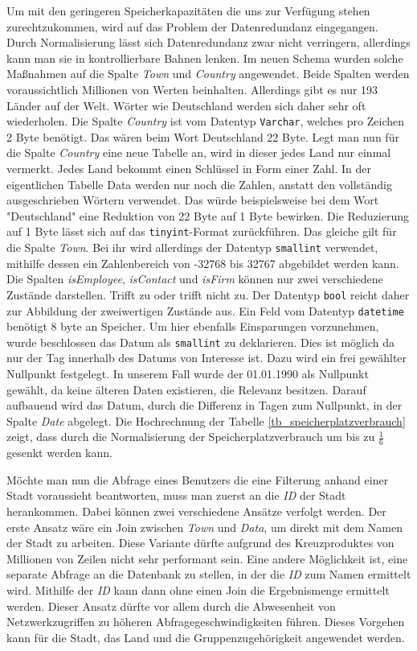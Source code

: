 Um mit den geringeren Speicherkapazitäten die uns zur Verfügung stehen zurechtzukommen, wird auf das Problem der Datenredundanz eingegangen. Durch Normalisierung lässt sich Datenredundanz zwar nicht verringern, allerdings kann man sie in kontrollierbare Bahnen lenken. Im neuen Schema wurden solche Maßnahmen auf die Spalte \textit{Town} und \textit{Country} angewendet. Beide Spalten werden voraussichtlich Millionen von Werten beinhalten. Allerdings gibt es nur 193 Länder auf der Welt. Wörter wie Deutschland werden sich daher sehr oft wiederholen. Die Spalte \textit{Country} ist vom Datentyp \texttt{Varchar}, welches pro Zeichen 2 Byte benötigt. Das wären beim Wort Deutschland 22 Byte. Legt man nun für die Spalte \textit{Country} eine neue Tabelle an, wird in dieser jedes Land nur einmal vermerkt. Jedes Land bekommt einen Schlüssel in Form einer Zahl. In der eigentlichen Tabelle Data werden nur noch die Zahlen, anstatt den vollständig ausgeschrieben Wörtern verwendet. Das würde beispielsweise bei dem Wort "Deutschland" eine Reduktion von 22 Byte auf 1 Byte bewirken. Die Reduzierung auf 1 Byte lässt sich auf das \texttt{tinyint}-Format zurückführen. Das gleiche gilt für die Spalte \textit{Town}. Bei ihr wird allerdings der Datentyp \texttt{smallint} verwendet, mithilfe dessen ein Zahlenbereich von -32768 bis 32767 abgebildet werden kann. Die Spalten \textit{isEmployee}, \textit{isContact} und \textit{isFirm} können nur zwei verschiedene Zustände darstellen. Trifft zu oder trifft nicht zu. Der Datentyp \texttt{bool} reicht daher zur Abbildung der zweiwertigen Zustände aus. Ein Feld vom Datentyp \texttt{datetime} benötigt 8 byte an Speicher. Um hier ebenfalls Einsparungen vorzunehmen, wurde beschlossen das Datum als \texttt{smallint} zu deklarieren. Dies ist möglich da nur der Tag innerhalb des Datums von Interesse ist. Dazu wird ein frei gewählter Nullpunkt festgelegt. In unserem Fall wurde der 01.01.1990 als Nullpunkt gewählt, da keine älteren Daten existieren, die Relevanz besitzen. Darauf aufbauend wird das Datum, durch die Differenz in Tagen zum Nullpunkt, in der Spalte \textit{Date} abgelegt. Die Hochrechnung der Tabelle \ref{tb_speicherplatzverbrauch} zeigt, dass durch die Normalisierung der Speicherplatzverbrauch um bis zu $ \frac{1}{6} $ gesenkt werden kann.


Möchte man nun die Abfrage eines Benutzers die eine Filterung anhand einer Stadt voraussieht beantworten, muss man zuerst an die \textit{ID} der Stadt herankommen. Dabei können zwei verschiedene Ansätze verfolgt werden. Der erste Ansatz wäre ein Join zwischen \textit{Town} und \textit{Data}, um direkt mit dem Namen der Stadt zu arbeiten. Diese Variante dürfte aufgrund des Kreuzproduktes von Millionen von Zeilen nicht sehr performant sein. Eine andere Möglichkeit ist, eine separate Abfrage an die Datenbank zu stellen, in der die \textit{ID} zum Namen ermittelt wird. Mithilfe der \textit{ID} kann dann ohne einen Join die Ergebnismenge ermittelt werden. Dieser Ansatz dürfte vor allem durch die Abwesenheit von Netzwerkzugriffen zu höheren Abfragegeschwindigkeiten führen. Dieses Vorgehen kann für die Stadt, das Land und die Gruppenzugehörigkeit angewendet werden.

